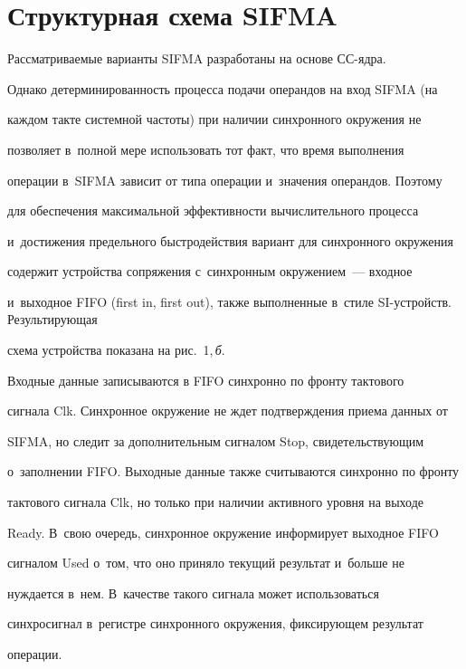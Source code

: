 \section{Структурная схема SIFMA}



      Рассматриваемые варианты SIFMA разработаны на основе СС-яд\-ра.

Однако детерминированность процесса подачи операндов на вход \mbox{SIFMA} (на

каждом такте системной частоты) при наличии синхронного окружения не

позволяет в~полной мере использовать тот факт, что время выполнения

операции в~\mbox{SIFMA} зависит от типа операции и~значения операндов. Поэтому

для обеспечения максимальной эффективности вычислительного процесса

и~достижения предельного быстродействия вариант для синхронного окружения

содержит устройства сопряжения с~синхронным окружением~--- входное

и~выходное FIFO (first in, first out), также выполненные в~стиле SI-устройств. Результирующая

схема устройства показана на рис.~1,\,\textit{б}.







      Входные данные записываются в FIFO синхронно по фронту тактового

сигнала Clk. Синхронное окружение не ждет подтверждения приема данных от

SIFMA, но следит за дополнительным сигналом Stop, свидетельствующим

о~заполнении FIFO. Выходные данные также считываются синхронно по фронту

тактового сигнала Clk, но только при наличии активного уровня на выходе

Ready. В~свою очередь, синхронное окружение информирует выходное FIFO

сигналом Used о~том, что оно приняло текущий результат и~больше не

нуждается в~нем. В~качестве такого сигнала может использоваться

синхросигнал в~регистре синхронного окружения, фиксирующем результат

операции.



